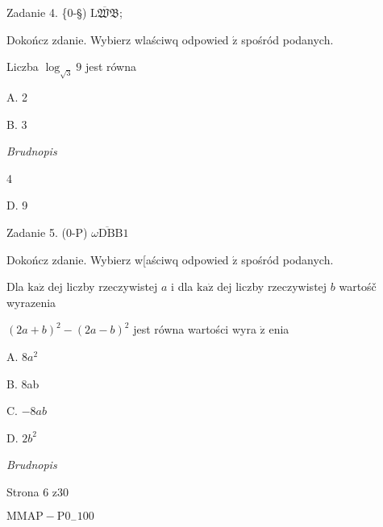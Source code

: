 \documentclass[a4paper,12pt]{article}
\begin{document}
Zadanie 4. \{0-\S) $\overline{\mathrm{L}\mathfrak{W}\mathfrak{B}}$;

Dokończ zdanie. Wybierz wlaściwq odpowied $\acute{\mathrm{z}}$ spośród podanych.

Liczba $\log_{\sqrt{3}}9$ jest równa

A. 2

B. 3

{\it Brudnopis}

4

D. 9

Zadanie 5. (0-P) $\overline{\omega \mathrm{D}\mathrm{B}\mathrm{B}}1$

Dokończ zdanie. Wybierz w[aściwq odpowied $\acute{\mathrm{z}}$ spośród podanych.

Dla $\mathrm{k}\mathrm{a}\dot{\mathrm{z}}$ dej liczby rzeczywistej $a$ i dla $\mathrm{k}\mathrm{a}\dot{\mathrm{z}}$ dej liczby rzeczywistej $b$ wartośč wyrazenia

$(2a+b)^{2}-(2a-b)^{2}$ jest równa wartości wyra $\dot{\mathrm{z}}$ enia

A. $8a^{2}$

B. 8ab

C. $-8ab$

D. $2b^{2}$

{\it Brudnopis}

Strona 6 z30

$\mathrm{M}\mathrm{M}\mathrm{A}\mathrm{P}-\mathrm{P}0_{-}100$
\end{document}
